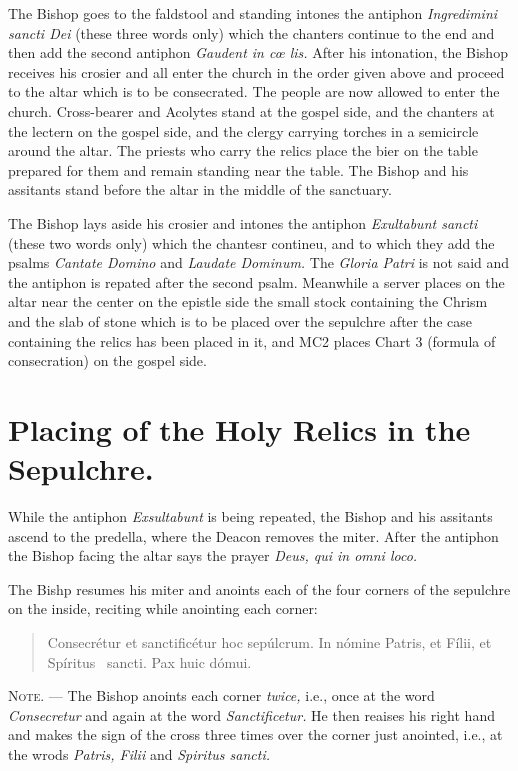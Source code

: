 \documentclass[letterpaper]{report}
\begin{document}
{\rubric The Bishop goes to the faldstool and standing intones the antiphon
\textit{Ingredimini sancti Dei} (these three words only) which the chanters
continue to the end and then add the second antiphon \textit{Gaudent in c\oe
lis.} After his intonation, the Bishop receives his crosier and all enter the
church in the order given above and proceed to the altar which is to be
consecrated. The people are now allowed to enter the church. Cross-bearer and
Acolytes stand at the gospel side, and the chanters at the lectern on the
gospel side, and the clergy carrying torches in a semicircle around the altar.
The priests who carry the relics place the bier on the table prepared for them
and remain standing near the table. The Bishop and his assitants stand before
the altar in the middle of the sanctuary.

\rubric The Bishop lays aside his crosier and intones the antiphon
\textit{Exultabunt sancti} (these two words only) which the chantesr contineu,
and to which they add the psalms \textit{Cantate Domino} and \textit{Laudate
Dominum.} The \textit{Gloria Patri} is not said and the antiphon is repated
after the second psalm. Meanwhile a server places on the altar near the center
on the epistle side the small stock containing the Chrism and the slab of stone
which is to be placed over the sepulchre after the case containing the relics
has been placed in it, and MC2 places Chart 3 (formula of consecration) on the
gospel side.

\section{Placing of the Holy Relics in the Sepulchre.}

\rubric While the antiphon \textit{Exsultabunt} is being repeated, the Bishop
and his assitants ascend to the predella, where the Deacon removes the miter.
After the antiphon the Bishop facing the altar says the prayer \textit{Deus,
qui in omni loco.}

\rubric The Bishp resumes his miter and anoints each of the four corners of the
sepulchre on the inside, reciting while anointing each corner:

\begin{quote}
    Conse\cross crétur et sancti\cross ficétur hoc sepúlcrum. In nómine
    Pa\cross tris, et Fí\cross lii, et Spíritus \cross\ sancti. Pax huic dómui.
\end{quote}

\textsc{Note. ---} The Bishop anoints each corner \textit{twice,} i.e., once at
the word \textit{Consecretur} and again at the word \textit{Sanctificetur.} He
then reaises his right hand and makes the sign of the cross three times over
the corner just anointed, i.e., at the wrods \textit{Patris, Filii} and
\textit{Spiritus sancti.}

}
\end{document}
